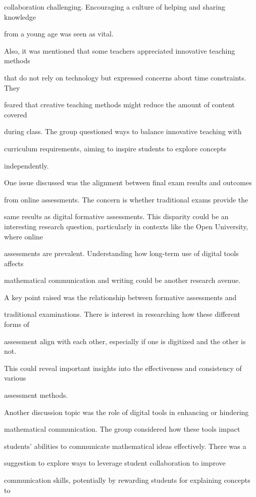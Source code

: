\documentclass[11pt]{article}
\begin{document}
collaboration challenging. Encouraging a culture of helping and sharing knowledge

from a young age was seen as vital.

Also, it was mentioned that some teachers appreciated innovative teaching methods

that do not rely on technology but expressed concerns about time constraints. They

feared that creative teaching methods might reduce the amount of content covered

during class. The group questioned ways to balance innovative teaching with

curriculum requirements, aiming to inspire students to explore concepts

independently.

One issue discussed was the alignment between final exam results and outcomes

from online assessments. The concern is whether traditional exams provide the

same results as digital formative assessments. This disparity could be an interesting research question, particularly in contexts like the Open University, where online

assessments are prevalent. Understanding how long-term use of digital tools affects

mathematical communication and writing could be another research avenue.

A key point raised was the relationship between formative assessments and

traditional examinations. There is interest in researching how these different forms of

assessment align with each other, especially if one is digitized and the other is not.

This could reveal important insights into the effectiveness and consistency of various

assessment methods.

Another discussion topic was the role of digital tools in enhancing or hindering

mathematical communication. The group considered how these tools impact

students' abilities to communicate mathematical ideas effectively. There was a

suggestion to explore ways to leverage student collaboration to improve

communication skills, potentially by rewarding students for explaining concepts to
\end{document}
